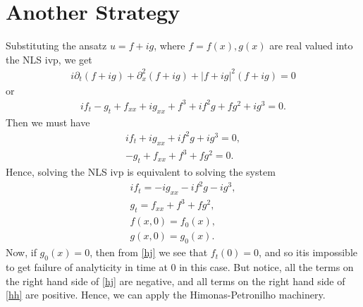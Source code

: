 \documentclass[12pt,reqno]{amsart}
\numberwithin{equation}{section}  %
\newcommand{\p}{\partial}
\begin{document}
\section{Another Strategy} 
\label{sec:another-strat}
Substituting the ansatz $u = f + ig$, where $f = f(x), g(x)$ are real valued into the NLS ivp, we get
%
%
\begin{equation*}
\begin{split}
  i \p_{t}(f + ig) + \p_{x}^{2}(f + ig) + | f + ig |^{2}(f + ig) = 0
\end{split}
\end{equation*}
%
%
or
%
%
\begin{equation*}
\begin{split}
  if_{t} - g_{t} + f_{xx} + ig_{xx} + f^{3} + if^{2}g + fg^{2} + ig^{3}=0.
\end{split}
\end{equation*}
%
%
Then we must have
\begin{gather*}
  if_{t} + ig_{xx} + if^{2}g + ig^{3}=0,
  \\
  -g_{t} + f_{xx} + f^{3} + fg^{2} = 0.
\end{gather*}
Hence, solving the NLS ivp is equivalent to solving the system
\begin{gather}
  if_{t} = -ig_{xx} - if^{2}g - ig^{3},
  \label{hj}
  \\
  g_{t} = f_{xx} + f^{3} + fg^{2},
  \label{hh}
  \\
  f(x,0) = f_{0}(x),
  \\
  g(x,0) = g_{0}(x).
\end{gather}
Now, if $g_{0}(x) = 0$, then from \eqref{hj} we see that $f_{t}(0) = 0$, and so itis impossible to get failure of analyticity in time at $0$ in this case. But notice, all the terms on the right hand side of \eqref{hj} are negative, and all terms on the right hand side of \eqref{hh} are positive. Hence, we can apply the Himonas-Petronilho machinery.
\end{document}
